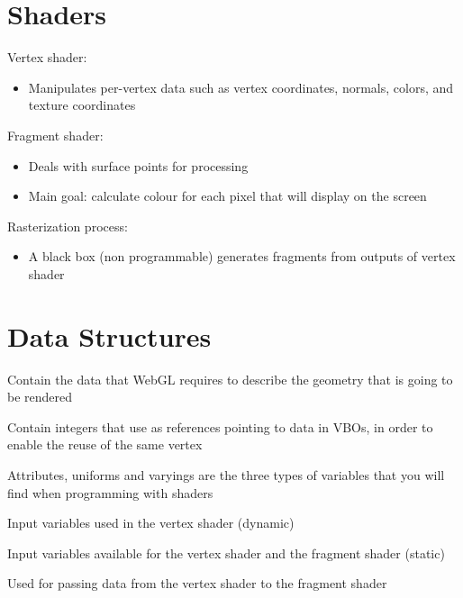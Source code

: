 \documentclass{article}[18pt]
\begin{document}
\section{Shaders}
Vertex shader:
\begin{itemize}
	\item Manipulates per-vertex data such as vertex coordinates, normals, colors, and texture coordinates
\end{itemize}
Fragment shader:
\begin{itemize}
	\item Deals with surface points for processing
	\item Main goal: calculate colour for each pixel that will display on the screen
\end{itemize}
Rasterization process:
\begin{itemize}
	\item A black box (non programmable) generates fragments from outputs of vertex shader
\end{itemize}
\section{Data Structures}
\begin{defin}
Contain the data that WebGL requires to describe the geometry that is going to be rendered
\end{defin}

\begin{defin}
	Contain integers that use as references pointing to data in VBOs, in order to enable the reuse of the same vertex
\end{defin}

Attributes, uniforms and varyings are the three types of variables that you will find when programming with shaders
\begin{defin}[Attributes]
	Input variables used in the vertex shader (dynamic)
\end{defin}

\begin{defin}[Uniforms]
Input variables available for the vertex shader and the fragment shader (static)
\end{defin}

\begin{defin}[Varyings]
Used for passing data from the vertex shader to the fragment shader
\end{defin}
\end{document}
